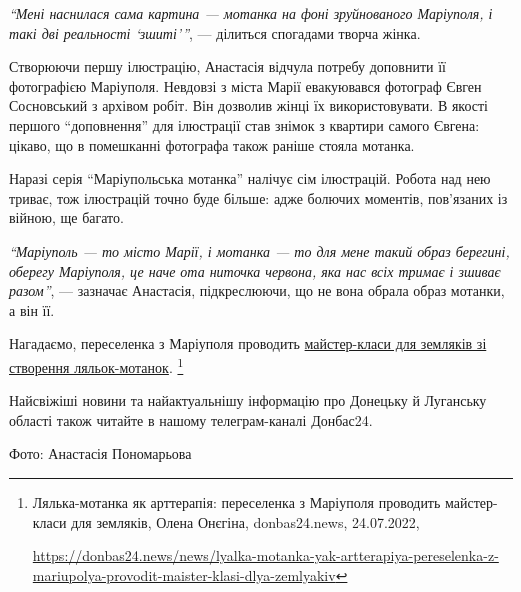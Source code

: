 \begin{leftbar}
\emph{\enquote{Мені наснилася сама картина — мотанка на фоні зруйнованого Маріуполя, і такі
дві реальності \enquote{зшиті}}}, — ділиться спогадами творча жінка. 
\end{leftbar}


Створюючи першу ілюстрацію, Анастасія відчула потребу доповнити її фотографією
Маріуполя. Невдовзі з міста Марії евакуювався фотограф Євген Сосновський з
архівом робіт. Він дозволив жінці їх використовувати. В якості першого
\enquote{доповнення} для ілюстрації став знімок з квартири самого Євгена: цікаво, що в
помешканні фотографа також раніше стояла мотанка.

Наразі серія \enquote{Маріупольська мотанка} налічує сім ілюстрацій. Робота над нею
триває, тож ілюстрацій точно буде більше: адже болючих моментів, пов'язаних із
війною, ще багато.


\begin{leftbar}
\emph{\enquote{Маріуполь — то місто Марії, і мотанка — то для мене такий образ берегині,
оберегу Маріуполя, це наче ота ниточка червона, яка нас всіх тримає і зшиває
разом}}, — зазначає Анастасія, підкреслюючи, що не вона обрала образ мотанки, а
він її.
\end{leftbar}

Нагадаємо, переселенка з Маріуполя проводить \href{https://donbas24.news/news/lyalka-motanka-yak-artterapiya-pereselenka-z-mariupolya-provodit-maister-klasi-dlya-zemlyakiv}{майстер-класи для земляків зі
створення ляльок-мотанок}.%
\footnote{Лялька-мотанка як арттерапія: переселенка з Маріуполя проводить майстер-класи для земляків, Олена Онєгіна, donbas24.news, 24.07.2022, \par\url{https://donbas24.news/news/lyalka-motanka-yak-artterapiya-pereselenka-z-mariupolya-provodit-maister-klasi-dlya-zemlyakiv}}

Найсвіжіші новини та найактуальнішу інформацію про Донецьку й Луганську області
також читайте в нашому телеграм-каналі Донбас24.

Фото: Анастасія Пономарьова

